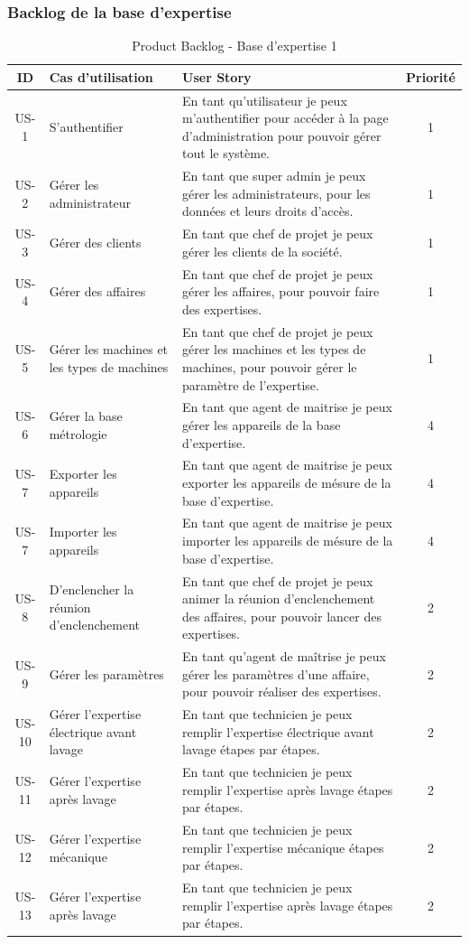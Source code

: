 \documentclass[11pt,a4paper]{article}
\begin{document}
\subsubsection*{Backlog de la base d'expertise}
\begin{table}[H]
\centering
\begin{tabular}{|c|p{5cm}|p{8cm}|c|}
\hline
\textbf{ID} & \textbf{Cas d'utilisation} & \textbf{User Story} & \textbf{Priorité} \\
\hline
US-1 & S’authentifier & En tant qu’utilisateur je peux m’authentifier pour accéder à la page d’administration pour pouvoir gérer tout le système. & 1 \\
\hline
US-2 & Gérer les administrateur & En tant que super admin je peux gérer les administrateurs, pour les données et leurs droits d’accès. & 1 \\
\hline
US-3 & Gérer des clients & En tant que chef de projet je peux gérer les clients de la société. & 1 \\
\hline
US-4 & Gérer des affaires & En tant que chef de projet je peux gérer les affaires, pour pouvoir faire des expertises. & 1 \\
\hline
US-5 & Gérer les machines et les types de machines & En tant que chef de projet je peux gérer les machines et les types de machines, pour pouvoir gérer le paramètre de l’expertise. & 1 \\
\hline
US-6 & Gérer la base métrologie & En tant que agent de maitrise je peux gérer les appareils de la base d'expertise. & 4 \\
\hline
US-7 & Exporter les appareils & En tant que agent de maitrise je peux exporter les appareils de mésure de la base d'expertise. & 4 \\
\hline
US-7 & Importer les appareils & En tant que agent de maitrise je peux importer les appareils de mésure de la base d'expertise. & 4 \\
\hline

US-8 & D’enclencher la réunion d’enclenchement & En tant que chef de projet je peux animer la réunion d’enclenchement des affaires, pour pouvoir lancer des expertises. & 2 \\
\hline
US-9 & Gérer les paramètres & En tant qu’agent de maîtrise je peux gérer les paramètres d’une affaire, pour pouvoir réaliser des expertises. & 2 \\
\hline
US-10 & Gérer l'expertise électrique avant lavage & En tant que technicien je peux remplir l’expertise électrique avant lavage étapes par étapes. & 2 \\
\hline
US-11 & Gérer l'expertise après lavage & En tant que technicien je peux remplir l’expertise après lavage étapes par étapes. & 2 \\
\hline
US-12 & Gérer l'expertise mécanique & En tant que technicien je peux remplir l’expertise mécanique étapes par étapes. & 2 \\
\hline
US-13 & Gérer l'expertise après lavage & En tant que technicien je peux remplir l’expertise après lavage étapes par étapes. & 2 \\
\hline

\end{tabular}
\caption{Product Backlog -  Base d'expertise 1}
\end{table}
\end{document}
